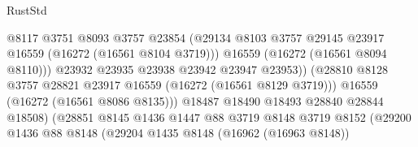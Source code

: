 \begin{lexlean}{RustStd}
\begin{coremodule}
                                              @8117
                                              @3751
                                              @8093
                                              @3757
                                              @23854
                                              (@29134
                                                @8103
                                                @3757
                                                @29145
                                                @23917
                                                @16559
                                                (@16272 (@16561 @8104 @3719)))
                                              @16559
                                              (@16272 (@16561 @8094 @8110)))
                                            @23932
                                            @23935
                                            @23938
                                            @23942
                                            @23947
                                            @23953))
                                        (@28810
                                          @8128
                                          @3757
                                          @28821
                                          @23917
                                          @16559
                                          (@16272 (@16561 @8129 @3719)))
                                        @16559
                                        (@16272 (@16561 @8086 @8135)))
                                      @18487
                                      @18490
                                      @18493
                                      @28840
                                      @28844
                                      @18508)
                                    (@28851
                                      @8145
                                      @1436
                                      @1447
                                      @88
                                      @3719
                                      @8148
                                      @3719
                                      @8152
                                      (@29200
                                        @1436
                                        @88
                                        @8148
                                        (@29204
                                          @1435
                                          @8148
                                          (@16962 (@16963 @8148))

\end{coremodule}
\end{lexlean}
